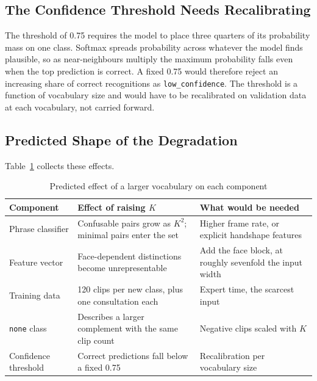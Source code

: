 \subsection{The Confidence Threshold Needs Recalibrating}

The threshold of 0.75 requires the model to place three quarters of its probability mass on
one class. Softmax spreads probability across whatever the model finds plausible, so as
near-neighbours multiply the maximum probability falls even when the top prediction is
correct. A fixed 0.75 would therefore reject an increasing share of correct recognitions as
\texttt{low\_confidence}. The threshold is a function of vocabulary size and would have to
be recalibrated on validation data at each vocabulary, not carried forward.

\subsection{Predicted Shape of the Degradation}

Table~\ref{tab:scaling} collects these effects.

\begin{table}[htbp]
    \centering
    \caption{Predicted effect of a larger vocabulary on each component}
    \label{tab:scaling}
    \small
    \begin{tabular}{|p{3.5cm}|p{4.3cm}|p{4.9cm}|}
        \hline
        \textbf{Component} & \textbf{Effect of raising $K$} & \textbf{What would be needed} \\
        \hline
        Phrase classifier & Confusable pairs grow as $K^2$; minimal pairs enter the set & Higher frame rate, or explicit handshape features \\
        \hline
        Feature vector & Face-dependent distinctions become unrepresentable & Add the face block, at roughly sevenfold the input width \\
        \hline
        Training data & 120 clips per new class, plus one consultation each & Expert time, the scarcest input \\
        \hline
        \texttt{none} class & Describes a larger complement with the same clip count & Negative clips scaled with $K$ \\
        \hline
        Confidence threshold & Correct predictions fall below a fixed 0.75 & Recalibration per vocabulary size \\
        \hline
    \end{tabular}
\end{table}

